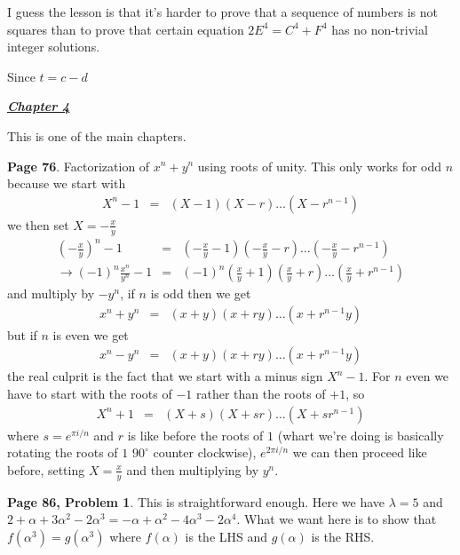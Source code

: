 \documentclass[aps,preprint,preprintnumbers,nofootinbib,showpacs,prd]{revtex4-1}
\newcommand{\nbea}{\begin{eqnarray*}}
\newcommand{\neea}{\end{eqnarray*}}
\begin{document}
I guess the lesson is that it's harder to prove that a sequence of numbers is not squares than to prove that certain equation $2E^4 = C^4 + F^4$ has no non-trivial integer solutions.

















Since $t = c - d$









\bigskip
\underline{\textbf{\textit{Chapter 4}}}
\bigskip

This is one of the main chapters.

{\bf Page 76}. Factorization of $x^n + y^n$ using roots of unity. This only works for odd $n$ because we start with 
%
\nbea
X^n - 1 & = & (X - 1)(X - r) \dots (X - r^{n-1})
\neea
%
we then set $X = -\frac{x}{y}$
%
\nbea
\left(-\tfrac{x}{y}\right)^n - 1 & = & (-\tfrac{x}{y} - 1)(-\tfrac{x}{y} - r) \dots (-\tfrac{x}{y} - r^{n-1}) \\
\to (-1)^n \tfrac{x^n}{y^n} - 1 & = & (-1)^n (\tfrac{x}{y} + 1)(\tfrac{x}{y} + r) \dots (\tfrac{x}{y} + r^{n-1})
\neea
%
and multiply by $-y^n$, if $n$ is odd then we get
%
\nbea
x^n + y^n & = & (x + y)(x + ry) \dots (x + r^{n-1}y)
\neea
%
but if $n$ is even we get
%
\nbea
x^n - y^n & = & (x + y)(x + ry) \dots (x + r^{n-1}y)
\neea
%
the real culprit is the fact that we start with a minus sign $X^n - 1$. For $n$ even we have to start with the roots of $-1$ rather than the roots of $+1$, so
%
\nbea
X^n + 1 & = & (X + s)(X + sr) \dots (X + sr^{n-1})
\neea
%
where $s = e^{\pi i/n}$ and $r$ is like before the roots of $1$ (whart we're doing is basically rotating the roots of $1$ $90^\circ$ counter clockwise), $e^{2\pi i/n}$ we can then proceed like before, setting $X = \frac{x}{y}$ and then multiplying by $y^n$.





{\bf Page 86, Problem 1}. This is straightforward enough. Here we have $\lambda = 5$ and $2 + \alpha + 3\alpha^2 - 2\alpha^3 = -\alpha + \alpha^2 - 4\alpha^3 - 2\alpha^4$. What we want here is to show that $f(\alpha^3) = g(\alpha^3)$ where $f(\alpha)$ is the LHS and $g(\alpha)$ is the RHS.
\end{document}

